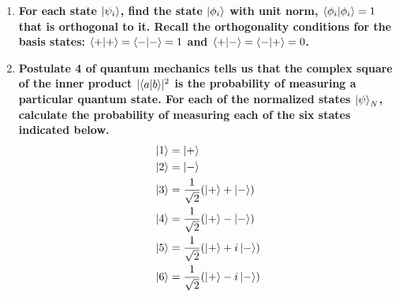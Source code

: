\documentclass[11pt]{article}
\newcommand*\abs[1]{\lvert#1\rvert}
\begin{document}
\begin{enumerate}[label=\textbf{\arabic*.}]
{\begin{enumerate}[label=\textbf{(\alph*)}]
{                }
                \item{
                    \textbf{\boldmath For each state \(\ket{\psi_i}\), find the state \(\ket{\phi_i}\) with unit norm, \(\braket{\phi_i|\phi_i}=1\) that is orthogonal to it. Recall the orthogonality conditions for the basis states: \(\braket{+|+}=\braket{-|-}=1\) and \(\braket{+|-}=\braket{-|+}=0\).}
                }
                \item{
                    \textbf{\boldmath Postulate 4 of quantum mechanics tells us that the complex square of the inner product \(\abs{\braket{a|b}}^2\) is the probability of measuring a particular quantum state. For each of the normalized states \(\ket{\psi}_N\), calculate the probability of measuring each of the six states indicated below. \begin{align*}\ket{1}&=\ket{+} \\ \ket{2}&=\ket{-} \\ \ket{3}&=\frac{1}{\sqrt 2}(\ket{+}+\ket{-}) \\ \ket{4}&=\frac{1}{\sqrt 2}(\ket{+}-\ket{-}) \\ \ket{5}&=\frac{1}{\sqrt 2}(\ket{+}+i\ket{-}) \\ \ket{6}&=\frac{1}{\sqrt 2}(\ket{+}-i\ket{-})\end{align*}}
                }
            \end{enumerate}
        }
    \end{enumerate}
\end{document}
